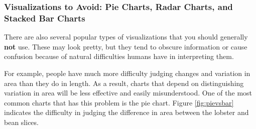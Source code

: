 \subsubsection*{Visualizations to Avoid: Pie Charts, Radar Charts, and Stacked Bar Charts}
There are also several popular types of visualizations that you should generally \textbf{not} use.  These may look pretty, but they tend to obscure information or cause confusion because of natural difficulties humans have in interpreting them.

For example, people have much more difficulty judging changes and variation in area than they do in length.  
As a result, charts that depend on distinguishing variation in area will be less effective and easily misunderstood.  One of the most common charts that has this problem is the pie chart. Figure \ref{fig:pievsbar} indicates the difficulty in judging the difference in area between the lobster and bean slices.

